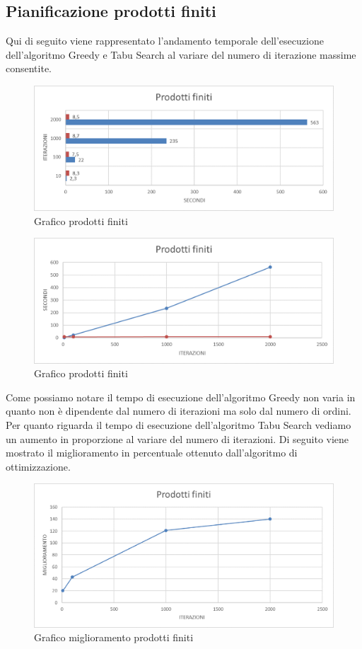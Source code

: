 \subsection{Pianificazione prodotti finiti}

Qui di seguito viene rappresentato l'andamento temporale dell'esecuzione dell'algoritmo Greedy e Tabu Search al variare del numero di iterazione massime consentite.
\begin{figure}[H]
	\includegraphics[width=13cm]{immagini/graficoPF.png}
	\centering
	\caption{Grafico prodotti finiti}
\end{figure}

\begin{figure}[H]
	\includegraphics[width=13cm]{immagini/graficoPF2.png}
	\centering
	\caption{Grafico prodotti finiti}
\end{figure}

Come possiamo notare il tempo di esecuzione dell'algoritmo Greedy non varia in quanto non è dipendente dal numero di iterazioni ma solo dal numero di ordini.\\
Per quanto riguarda il tempo di esecuzione dell'algoritmo Tabu Search vediamo un aumento in proporzione al variare del numero di iterazioni.
Di seguito viene mostrato il miglioramento in percentuale ottenuto dall'algoritmo di ottimizzazione.

\begin{figure}[H]
	\includegraphics[width=13cm]{immagini/graficoPF3.png}
	\centering
	\caption{Grafico miglioramento prodotti finiti}
\end{figure}

